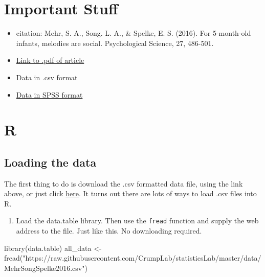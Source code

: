\documentclass[
]{book}
\newenvironment{Shaded}{\begin{snugshade}}{\end{snugshade}}
\newcommand{\FunctionTok}[1]{\textcolor[rgb]{0.00,0.00,0.00}{#1}}
\newcommand{\NormalTok}[1]{#1}
\newcommand{\OtherTok}[1]{\textcolor[rgb]{0.56,0.35,0.01}{#1}}
\newcommand{\StringTok}[1]{\textcolor[rgb]{0.31,0.60,0.02}{#1}}
\providecommand{\tightlist}{%
  \setlength{\itemsep}{0pt}\setlength{\parskip}{0pt}}
\begin{document}
\hypertarget{important-stuff}{%
\section{Important Stuff}\label{important-stuff}}

\begin{itemize}
\tightlist
\item
  citation: Mehr, S. A., Song. L. A., \& Spelke, E. S. (2016). For 5-month-old infants, melodies are social. Psychological Science, 27, 486-501.
\item
  \href{http://journals.sagepub.com/stoken/default+domain/d5HcBHg85XamSXGdYqYN/full}{Link to .pdf of article}
\item
  Data in .csv format
\item
  \href{https://drive.google.com/open?id=0Bz-rhZ21ShvOa3c4X3hqOWxwcUU}{Data in SPSS format}
\end{itemize}

\hypertarget{r-6}{%
\section{R}\label{r-6}}

\hypertarget{loading-the-data}{%
\subsection{Loading the data}\label{loading-the-data}}

The first thing to do is download the .csv formatted data file, using the link above, or just click \href{https://drive.google.com/open?id=0Bz-rhZ21ShvOdW1wV0pmUTJSSk0}{here}. It turns out there are lots of ways to load .csv files into R.

\begin{enumerate}
\def\labelenumi{\arabic{enumi}.}
\tightlist
\item
  Load the data.table library. Then use the \texttt{fread} function and supply the web address to the file. Just like this. No downloading required.
\end{enumerate}

\begin{Shaded}
\begin{Highlighting}[]
\FunctionTok{library}\NormalTok{(data.table)}
\NormalTok{all\_data }\OtherTok{\textless{}{-}} \FunctionTok{fread}\NormalTok{(}\StringTok{"https://raw.githubusercontent.com/CrumpLab/statisticsLab/master/data/MehrSongSpelke2016.csv"}\NormalTok{)}
\end{Highlighting}
\end{Shaded}
\end{document}
